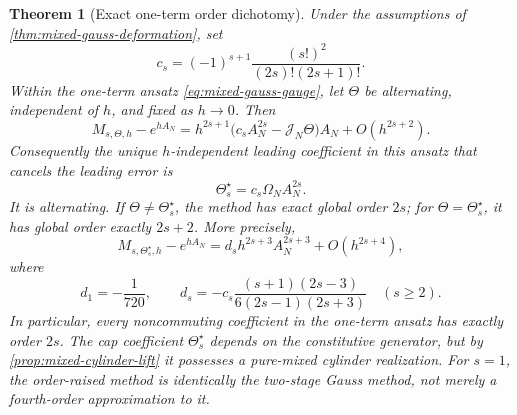 \documentclass[11pt,a4paper]{article}
\newtheorem{theorem}{Theorem}[section]
\begin{document}
\begin{theorem}[Exact one-term order dichotomy]
\label{thm:unique-order-raising-gauge}
Under the assumptions of \cref{thm:mixed-gauss-deformation}, set
\begin{equation}\label{eq:pade-leading-coefficient}
 c_s=(-1)^{s+1}\frac{(s!)^2}{(2s)!(2s+1)!}.
\end{equation}
Within the one-term ansatz \cref{eq:mixed-gauss-gauge}, let \(\Theta\)
be alternating, independent of \(h\), and fixed as \(h\to0\).  Then
\begin{equation}\label{eq:mixed-gauss-leading-error}
 M_{s,\Theta,h}-e^{hA_N}
 =h^{2s+1}\bigl(c_sA_N^{2s}-\mathcal J_N\Theta\bigr)A_N
  +O(h^{2s+2}).
\end{equation}
Consequently the unique \(h\)-independent leading coefficient in this
ansatz that cancels the leading error is
\begin{equation}\label{eq:unique-order-raising-gauge}
 \boxed{\quad
 \Theta_s^\star=c_s\Omega_NA_N^{2s}.
 \quad}
\end{equation}
It is alternating.  If \(\Theta\ne\Theta_s^\star\), the method has
exact global order \(2s\); for \(\Theta=\Theta_s^\star\), it has global
order exactly \(2s+2\).  More precisely,
\begin{equation}\label{eq:raised-branch-leading-error}
 M_{s,\Theta_s^\star,h}-e^{hA_N}
 =d_sh^{2s+3}A_N^{2s+3}+O(h^{2s+4}),
\end{equation}
where
\begin{equation}\label{eq:second-cayley-coefficient}
 d_1=-\frac1{720},\qquad
 d_s=-c_s\frac{(s+1)(2s-3)}{6(2s-1)(2s+3)}\quad(s\ge2).
\end{equation}
In particular, every noncommuting coefficient in the one-term ansatz has
exactly order \(2s\).  The cap coefficient
\(\Theta_s^\star\) depends on the constitutive generator, but by
\cref{prop:mixed-cylinder-lift} it possesses a pure-mixed cylinder
realization.  For \(s=1\), the order-raised method is identically the
two-stage Gauss method, not merely a fourth-order approximation to it.
\end{theorem}
\end{document}
